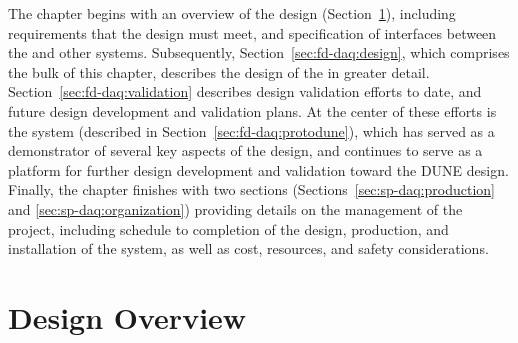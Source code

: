 The chapter begins with an overview of the  design
(Section~\ref{sec:fd-daq:overview}), including requirements that the design
must meet, and specification of interfaces between the   and other
  systems.  Subsequently,
Section~\ref{sec:fd-daq:design}, which comprises the bulk of this chapter,
describes the design of the   in greater detail.
Section~\ref{sec:fd-daq:validation} describes design validation efforts to
date, and future design development and validation plans. At the center of
these efforts is the    system (described in
Section~\ref{sec:fd-daq:protodune}), which has served as a demonstrator of
several key aspects of the      design, and continues
to serve as a platform for further design development and validation toward
the DUNE   design.  Finally, the chapter finishes with two sections
(Sections~\ref{sec:sp-daq:production} and \ref{sec:sp-daq:organization})
providing details on the management of the  project, including
schedule to completion of the design,  production, and installation of the
system, as well as cost, resources, and safety considerations.

\section{Design Overview}
\label{sec:fd-daq:overview}

